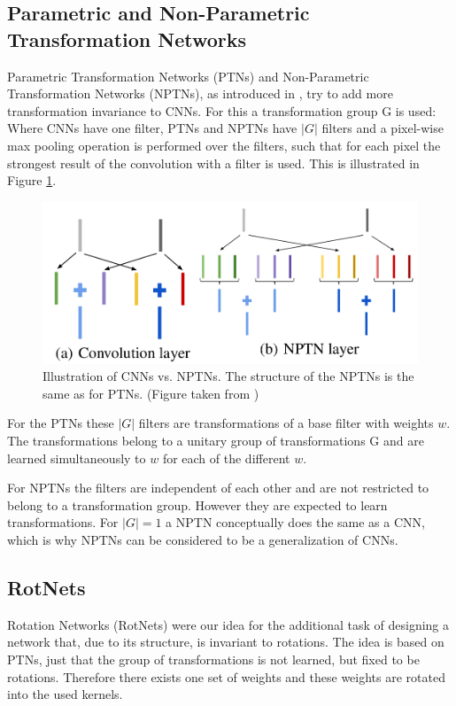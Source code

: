 \documentclass{llncs}
\begin{document}
\subsection{Parametric and Non-Parametric Transformation Networks}

Parametric Transformation Networks (PTNs) and Non-Parametric Transformation Networks (NPTNs), as introduced in \cite{NPTN18}, try to add more transformation invariance to CNNs. For this a transformation group G is used:
Where CNNs have one filter, PTNs and NPTNs have $|G|$ filters and a pixel-wise max pooling operation is performed over the filters, such that for each pixel the strongest result of the convolution with a filter is used. This is illustrated in Figure \ref{pic:nptn}.


\begin{figure}
	\begin{center}
	\includegraphics[scale=0.15]{result_images/nptn_paper.png}
	\caption{Illustration of CNNs vs. NPTNs. The structure of the NPTNs is the same as for PTNs. (Figure taken from \cite{NPTN18})}
	\label{pic:nptn}
	\end{center}
\end{figure}
For the PTNs these $|G|$ filters are transformations of a base filter with weights $w$. The transformations belong to a unitary group of transformations G and are learned simultaneously to $w$ for each of the different $w$. 


For NPTNs the filters are independent of each other and are not restricted to belong to a transformation group. However they are expected to learn transformations.
For $|G|=1$ a NPTN conceptually does the same as a CNN, which is why NPTNs can be considered to be a generalization of CNNs. 



\subsection{RotNets}
Rotation Networks (RotNets) were our idea for the additional task of designing a network that, due to its structure, is invariant to rotations. 
The idea is based on PTNs, just that the group of transformations is not learned, but fixed to be rotations. Therefore there exists one set of weights and these weights are rotated into the used kernels. 
\newcommand{\pytorch}{PyTorch }
\end{document}
